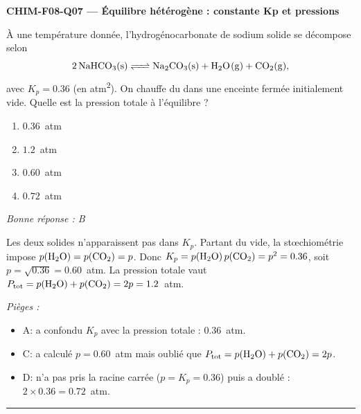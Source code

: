 \documentclass[11pt,a4paper]{article}
\begin{document}
\noindent\textbf{CHIM-F08-Q07 --- Équilibre hétérogène : constante Kp et pressions}\par
À une température donnée, l'hydrogénocarbonate de sodium solide se décompose selon
\[ \ce{2 NaHCO3(s) <=> Na2CO3(s) + H2O(g) + CO2(g)}, \]
avec $K_p=\num{0.36}$ (en atm\textsuperscript{2}). On chauffe du  dans une enceinte fermée initialement vide. Quelle est la pression totale à l'équilibre ?
\begin{enumerate}[label=\Alph*)]
\item $\num{0.36}$~atm
\item $\num{1.2}$~atm
\item $\num{0.60}$~atm
\item $\num{0.72}$~atm
\end{enumerate}
\textit{Bonne réponse : B}\par
Les deux solides n'apparaissent pas dans $K_p$. Partant du vide, la stœchiométrie impose $p(\ce{H2O})=p(\ce{CO2})=p$. Donc $K_p=p(\ce{H2O})\,p(\ce{CO2})=p^2=\num{0.36}$, soit $p=\sqrt{\num{0.36}}=\num{0.60}$~atm. La pression totale vaut $P_{\text{tot}}=p(\ce{H2O})+p(\ce{CO2})=2p=\num{1.2}$~atm.\par
\textit{Pièges :}
\begin{itemize}
\item A: a confondu $K_p$ avec la pression totale : $\num{0.36}$~atm.
\item C: a calculé $p=\num{0.60}$~atm mais oublié que $P_{\text{tot}}=p(\ce{H2O})+p(\ce{CO2})=2p$.
\item D: n'a pas pris la racine carrée ($p=K_p=\num{0.36}$) puis a doublé : $2\times\num{0.36}=\num{0.72}$~atm.
\end{itemize}
\vspace{8pt}\hrule\vspace{8pt}
\end{document}
